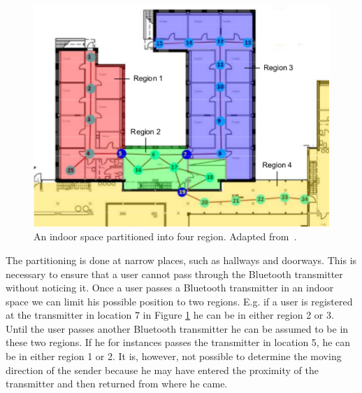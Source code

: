 \begin{figure}%
\includegraphics[width=\columnwidth]{images/partionedcluster}%
\caption{An indoor space partitioned into four region. Adapted from~\cite{6068444}.}%
\label{fig:partionedcluster}%
\end{figure}%
The partitioning is done at narrow places, such as hallways and doorways. 
This is necessary to ensure that a user cannot pass through the Bluetooth transmitter without noticing it. 
Once a user passes a Bluetooth transmitter in an indoor space we can limit his possible position to two regions. 
E.g. if a user is registered at the transmitter in location 7 in Figure \ref{fig:partionedcluster} he can be in either region 2 or 3. 
Until the user passes another Bluetooth transmitter he can be assumed to be in these two regions.
If he for instances passes the transmitter in location 5, he can be in either region 1 or 2. 
It is, however, not possible to determine the moving direction of the sender because he may have entered the proximity of the transmitter and then returned from where he came. 

